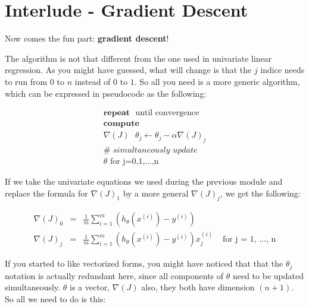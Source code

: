 
\section*{Interlude - Gradient Descent}

Now comes the fun part: \textbf{gradient descent}!

The algorithm is not that different from the one used in univariate 
linear regression. As you might have guessed, what will change is 
that the $j$ indice needs to run from $0$ to $n$ instead of $0$ 
to $1$. So all you need is a more generic algorithm, which can be 
expressed in pseudocode as the following:

$$ 
\begin{matrix}
\textbf{repeat} \text{ } \text{until convergence} \\
\textbf{compute} \\
\nabla{(J)} \text{ } \theta_j \gets \theta_j - \alpha \nabla(J)_j \\
\textit{# simultaneously update} \\
\theta \text{ for j=0,1,...,n}
\end{matrix}
$$




If we take the univariate equations we used during the previous module and replace the formula for $\nabla(J)_1$ by a more general $\nabla(J)_j$, we get the following:

$$
\begin{matrix}
\nabla(J)_0 &  = &\frac{1}{m}\sum_{i=1}^{m}(h_{\theta}(x^{(i)}) - y^{(i)}) & \\
\nabla(J)_j & = &\frac{1}{m}\sum_{i=1}^{m}(h_{\theta}(x^{(i)}) - y^{(i)})x_{j}^{(i)} & \text{ for j = 1, ..., n}    
\end{matrix}
$$

If you started to like vectorized forms, you might have noticed that that the $\theta_j$ notation is actually redundant here, since all components of $\theta$ need to be updated simultaneously. $\theta$ is a vector, $\nabla{(J)}$ also, they both have dimension $(n+1)$. So all we need to do is this:


